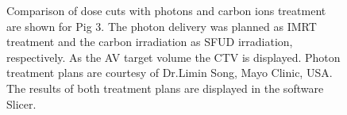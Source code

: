 \newpage

\begin{figure}[H]
\centering
{}
\caption{Comparison of dose cuts with photons and carbon ions treatment are shown for Pig 3. The photon delivery was planned as IMRT treatment 
and the carbon irradiation as SFUD irradiation, respectively. As the AV target volume the CTV is displayed. 
Photon treatment plans are courtesy of Dr.Limin Song, Mayo Clinic, USA. The results of both treatment plans are displayed in the software Slicer.}
\label{dose_porcine_photon_vs_carbon}
\end{figure}

